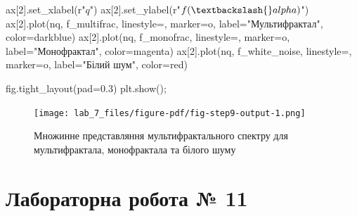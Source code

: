 \documentclass[
  letterpaper,
]{report}
\newenvironment{Shaded}{\begin{snugshade}}{\end{snugshade}}
\newcommand{\DecValTok}[1]{\textcolor[rgb]{0.68,0.00,0.00}{#1}}
\newcommand{\FloatTok}[1]{\textcolor[rgb]{0.68,0.00,0.00}{#1}}
\newcommand{\NormalTok}[1]{\textcolor[rgb]{0.00,0.23,0.31}{#1}}
\newcommand{\OperatorTok}[1]{\textcolor[rgb]{0.37,0.37,0.37}{#1}}
\newcommand{\StringTok}[1]{\textcolor[rgb]{0.13,0.47,0.30}{#1}}
\newcommand{\VerbatimStringTok}[1]{\textcolor[rgb]{0.13,0.47,0.30}{#1}}
\begin{document}
\begin{Shaded}
\begin{Highlighting}[]
\NormalTok{ax[}\DecValTok{2}\NormalTok{].set\_xlabel(}\VerbatimStringTok{r"$q$"}\NormalTok{)}
\NormalTok{ax[}\DecValTok{2}\NormalTok{].set\_ylabel(}\VerbatimStringTok{r"$f(\textbackslash{}alpha)$"}\NormalTok{)}
\NormalTok{ax[}\DecValTok{2}\NormalTok{].plot(nq, f\_multifrac, linestyle}\OperatorTok{=}\StringTok{\textquotesingle{}{-}\textquotesingle{}}\NormalTok{, marker}\OperatorTok{=}\StringTok{\textquotesingle{}o\textquotesingle{}}\NormalTok{, label}\OperatorTok{=}\StringTok{"Мультифрактал"}\NormalTok{, color}\OperatorTok{=}\StringTok{\textquotesingle{}darkblue\textquotesingle{}}\NormalTok{)}
\NormalTok{ax[}\DecValTok{2}\NormalTok{].plot(nq, f\_monofrac, linestyle}\OperatorTok{=}\StringTok{\textquotesingle{}{-}\textquotesingle{}}\NormalTok{, marker}\OperatorTok{=}\StringTok{\textquotesingle{}o\textquotesingle{}}\NormalTok{, label}\OperatorTok{=}\StringTok{"Монофрактал"}\NormalTok{, color}\OperatorTok{=}\StringTok{\textquotesingle{}magenta\textquotesingle{}}\NormalTok{)}
\NormalTok{ax[}\DecValTok{2}\NormalTok{].plot(nq, f\_white\_noise, linestyle}\OperatorTok{=}\StringTok{\textquotesingle{}{-}\textquotesingle{}}\NormalTok{, marker}\OperatorTok{=}\StringTok{\textquotesingle{}o\textquotesingle{}}\NormalTok{, label}\OperatorTok{=}\StringTok{"Білий шум"}\NormalTok{, color}\OperatorTok{=}\StringTok{\textquotesingle{}red\textquotesingle{}}\NormalTok{)}

\NormalTok{fig.tight\_layout(pad}\OperatorTok{=}\FloatTok{0.3}\NormalTok{) }
\NormalTok{plt.show()}\OperatorTok{;}
\end{Highlighting}
\end{Shaded}

\begin{figure}[H]

{\centering \texttt{[image: lab\_7\_files/figure-pdf/fig-step9-output-1.png]}

}

\caption{\label{fig-step9}Множинне представляння мультифрактального
спектру для мультифрактала, монофрактала та білого шуму}

\end{figure}


\hypertarget{ux43bux430ux431ux43eux440ux430ux442ux43eux440ux43dux430-ux440ux43eux431ux43eux442ux430-11}{%
\chapter{Лабораторна робота №
11}\label{ux43bux430ux431ux43eux440ux430ux442ux43eux440ux43dux430-ux440ux43eux431ux43eux442ux430-11}}
\end{document}

